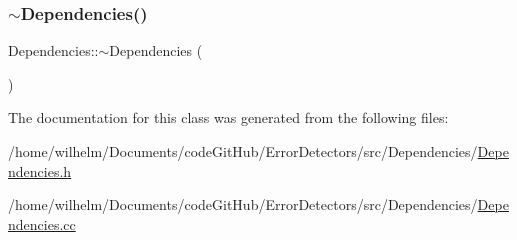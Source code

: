 \mbox{\label{class_dependencies_aeaa0706664765dd19c545f9683bf1aea}} 
\subsubsection{\texorpdfstring{$\sim$\+Dependencies()}{~Dependencies()}}
{\footnotesize\ttfamily Dependencies\+::$\sim$\+Dependencies (\begin{DoxyParamCaption}{ }\end{DoxyParamCaption})\hspace{0.3cm}{\ttfamily [pure virtual]}}



The documentation for this class was generated from the following files\+:\begin{DoxyCompactItemize}
\item 
/home/wilhelm/\+Documents/code\+Git\+Hub/\+Error\+Detectors/src/\+Dependencies/\hyperlink{_dependencies_8h}{Dependencies.\+h}\item 
/home/wilhelm/\+Documents/code\+Git\+Hub/\+Error\+Detectors/src/\+Dependencies/\hyperlink{_dependencies_8cc}{Dependencies.\+cc}\end{DoxyCompactItemize}
